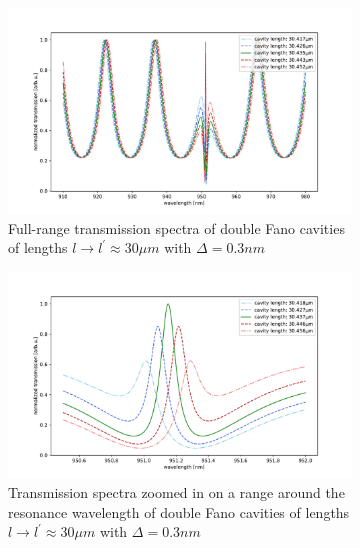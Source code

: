 \begin{figure}[h!]
    \centering
    \begin{subfigure}[b]{0.49\textwidth}
        \includegraphics[width=\textwidth]{figures/detuned_length_scan_long.pdf}
        \caption{Full-range transmission spectra of double Fano cavities of lengths $l \rightarrow l^{\prime} \approx 30 \mu m$ with $\Delta = 0.3nm$}
        \label{fig:detuned_length_scan_long}
    \end{subfigure}
    \begin{subfigure}[b]{0.49\textwidth}
        \includegraphics[width=\textwidth]{figures/detuned_length_scan_short.pdf}
        \caption{Transmission spectra zoomed in on a range around the resonance wavelength of double Fano cavities of lengths $l \rightarrow l^{\prime} \approx 30 \mu m$ with $\Delta = 0.3nm$}
        \label{fig:detuned_length_scan_short}
    \end{subfigure}
    \caption{}
    \label{fig:mid_detuning_length_scans}
\end{figure}

